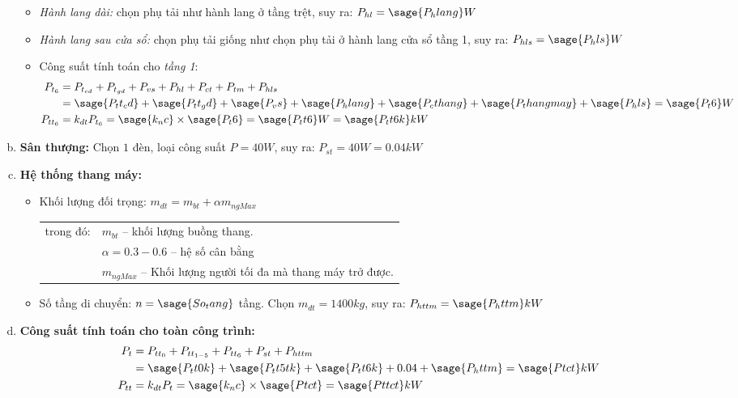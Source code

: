 \begin{enumerate}[a.]
\begin{itemize}
\item \textit{Hành lang dài:} chọn phụ tải như hành lang ở tầng trệt, suy ra: $P_{hl} = \sage{P_hlang}W$
\item \textit{Hành lang sau cửa sổ:} chọn phụ tải giống như chọn phụ tải ở hành lang cửa sổ tầng 1, suy ra: $P_{hls} = \sage{P_hls}W$
\item Công suất tính toán cho \textit{tầng 1}:
\begin{equation*}
\begin{split}
P_{{t_6}} & = P_{t_{cd}} + P_{t_{gd}} + P_{vs} + P_{hl} + P_{ct} + P_{tm} + P_{hls}\\
& =  \sage{P_tt_cd} + \sage{P_tt_gd} + \sage{P_vs} + \sage{P_hlang} + \sage{P_cthang} + \sage{P_thangmay} +\sage{P_hls}= \sage{P_t6}W\\
P_{{tt_6}} & = k_{dt}P_{{t_6}} = \sage{k_nc}\times\sage{P_t6} = \sage{P_tt6}W=\sage{P_tt6k}kW
\end{split}
\end{equation*}
\end{itemize}
\item \textbf{Sân thượng:} Chọn $1$ đèn, loại công suất $P=40W$, suy ra: $P_{st}=40W=0.04kW$
\item \textbf{Hệ thống thang máy:}
\begin{itemize}
\item Khối lượng đối trọng: $m_{dt}=m_{bt}+\alpha m_{ngMax}$\\
\begin{tabular}{ll}
trong đó:& $m_{bt}$ -- khối lượng buồng thang.\\
& $\alpha = 0.3 - 0.6$ -- hệ số cân bằng\\
& $m_{ngMax}$ -- Khối lượng người tối đa mà thang máy trở được.
\end{tabular}
\item Số tầng di chuyển: $n = \sage{So_tang}$ tầng. Chọn $m_{dt}=1400kg$, suy ra: $P_{httm}=\sage{P_httm}kW$
\end{itemize}
\item \textbf{Công suất tính toán cho toàn công trình:}
\begin{equation*}
\begin{split}
P_{{t}} & = P_{{tt}_{0}} + P_{{tt}_{1-5}} + P_{{tt}_{6}} + P_{st} + P_{httm}\\
& = \sage{P_tt0k} + \sage{P_tt5tk} + \sage{P_tt6k} + 0.04 + \sage{P_httm}=\sage{Ptct}kW\\
P_{tt} & = k_{dt}P_t = \sage{k_nc}\times\sage{Ptct} = \sage{Pttct}kW
\end{split}

\end{equation*}
\end{enumerate}
